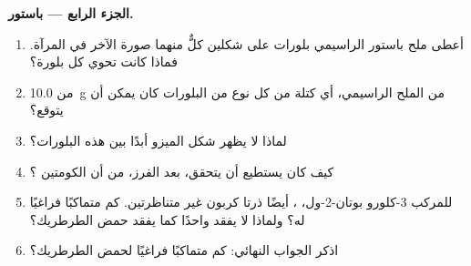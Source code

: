 \begin{problem}
\medskip
\noindent\textbf{الجزء الرابع --- باستور.}
\begin{enumerate}[resume]
  \item أعطى ملح باستور الراسيمي بلورات على شكلين كلٌّ منهما صورة الآخر في المرآة.
        فماذا كانت تحوي كل بلورة؟
  \item من \qty{10.0}{g} من الملح الراسيمي، أي كتلة من كل نوع من
        البلورات كان يمكن أن يتوقع؟
  \item لماذا لا يظهر شكل الميزو أبدًا بين هذه البلورات؟
  \item كيف كان يستطيع أن يتحقق، بعد الفرز، من أن الكومتين
        ؟
  \item للمركب 3-كلورو بوتان-2-ول، ، أيضًا ذرتا كربون
        غير متناظرتين. كم متماكبًا فراغيًا له؟ ولماذا لا
        يفقد واحدًا كما يفقد حمض الطرطريك؟
  \item اذكر الجواب النهائي: كم متماكبًا فراغيًا لحمض الطرطريك؟
\end{enumerate}
\end{problem}
